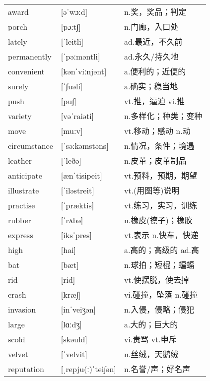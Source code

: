 \documentclass[a4paper]{article}
\begin{document}
\section{}
\begin{tabular}{l l l}

award & [əˈwɔːd] & n.奖，奖品；判定 \\
porch & [pɔːt∫] & n.门廊，入口处 \\
lately & [ˈleitli] & ad.最近，不久前 \\
permanently & [ˈpəːməntli] & ad.永久/持久地 \\
convenient & [kənˈviːnjənt] & a.便利的；近便的 \\
surely & [ˈ∫uəli] & a.确实；稳当地 \\
push & [pu∫] & vt.推，逼迫 vi.推 \\
variety & [vəˈraiəti] & n.多样化；种类；变种 \\
move & [muːv] & vt.移动；感动 n.动 \\
circumstance & [ˈsəːkəmstəns] & n.情况，条件；境遇 \\
leather & [ˈleðə] & n.皮革；皮革制品 \\
anticipate & [ænˈtisipeit] & vt.预料，预期，期望 \\
illustrate & [ˈiləstreit] & vt.(用图等)说明 \\
practise & [ˈpræktis] & vt.练习，实习，训练 \\
rubber & [ˈrʌbə] & n.橡皮(擦子)；橡胶 \\
express & [iksˈpres] & vt.表示 n.快车，快递 \\
high & [hai] & a.高的；高级的 ad.高 \\
bat & [bæt] & n.球拍；短棍；蝙蝠 \\
rid & [rid] & vt.使摆脱，使去掉 \\
crash & [kræ∫] & vi.碰撞，坠落 n.碰撞 \\
invasion & [inˈveiʒən] & n.入侵，侵略；侵犯 \\
large & [lɑːdʒ] & a.大的；巨大的 \\
scold & [skəuld] & vi.责骂 vt.申斥 \\
velvet & [ˈvelvit] & n.丝绒，天鹅绒 \\
reputation & [ˌrepju(ː)ˈtei∫ən] & n.名誉/声；好名声 \\

\end{tabular}
\end{document}
